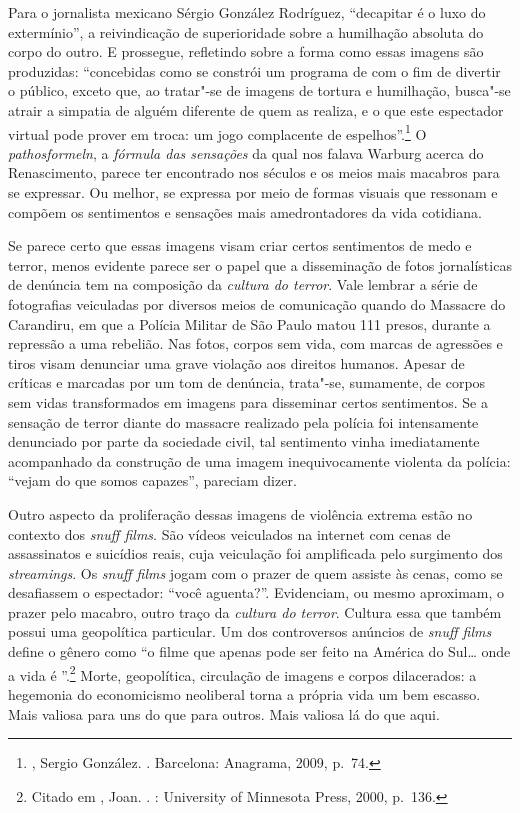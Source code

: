 Para o
jornalista mexicano Sérgio González Rodríguez, ``decapitar é o luxo do
extermínio'', a reivindicação de superioridade sobre a humilhação
absoluta do corpo do outro. E prossegue, refletindo sobre a forma como
essas imagens são produzidas: ``concebidas como se constrói um programa
de  com o fim de divertir o público, exceto que, ao tratar"-se de
imagens de tortura e humilhação, busca"-se atrair a simpatia de alguém
diferente de quem as realiza, e o que este espectador virtual pode
prover em troca: um jogo complacente de espelhos''.\footnote{,
  Sergio González. {}. Barcelona: Anagrama,
  2009, p.~74.} O \emph{pathosformeln}, a \emph{fórmula das
sensações} da qual nos falava Warburg acerca do Renascimento, parece ter
encontrado nos séculos  e  os meios mais macabros para se
expressar. Ou melhor, se expressa por meio de formas visuais que
ressonam e compõem os sentimentos e sensações mais amedrontadores da
vida cotidiana.

Se parece certo que essas imagens visam criar certos sentimentos de medo
e terror, menos evidente parece ser o papel que a disseminação de fotos
jornalísticas de denúncia tem na composição da \emph{cultura do terror}.
Vale lembrar a série de fotografias veiculadas por diversos meios de
comunicação quando do Massacre do Carandiru, em que a Polícia Militar de
São Paulo matou 111 presos, durante a repressão a uma rebelião. Nas
fotos, corpos sem vida, com marcas de agressões e tiros visam denunciar
uma grave violação aos direitos humanos. Apesar de críticas e marcadas
por um tom de denúncia, trata"-se, sumamente, de corpos sem vidas
transformados em imagens para disseminar certos sentimentos. Se a
sensação de terror diante do massacre realizado pela polícia foi
intensamente denunciado por parte da sociedade civil, tal sentimento
vinha imediatamente acompanhado da construção de uma imagem
inequivocamente violenta da polícia: ``vejam do que somos capazes'',
pareciam dizer.


\asterisc

Outro aspecto da proliferação dessas imagens de violência extrema estão no
contexto dos \emph{snuff films}. São vídeos veiculados na internet com
cenas de assassinatos e suicídios reais, cuja veiculação foi amplificada
pelo surgimento dos \emph{streamings}. Os \emph{snuff films} jogam com o
prazer de quem assiste às cenas, como se desafiassem o espectador: ``você
aguenta?''. Evidenciam, ou mesmo aproximam, o prazer pelo macabro, outro
traço da \emph{cultura do terror}. Cultura essa que também possui uma
geopolítica particular. Um dos controversos anúncios de \emph{snuff
films} define o gênero como ``o filme que apenas pode ser feito na
América do Sul\ldots{} onde a vida é ''.\footnote{Citado em , Joan. {}. : University of Minnesota Press, 2000, p.~136.} Morte,
geopolítica, circulação de imagens e corpos dilacerados: a hegemonia do
economicismo neoliberal torna a própria vida um bem escasso. Mais
valiosa para uns do que para outros. Mais valiosa lá do que aqui.

